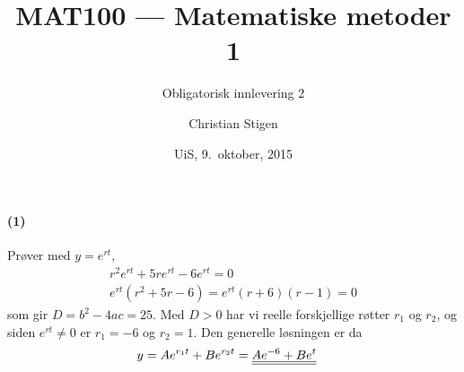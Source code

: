 \documentclass[a4paper,norsk,12pt]{article}
\title{MAT100 --- Matematiske metoder 1}
\subtitle{Obligatorisk innlevering 2}
\author{Christian Stigen}
\date{UiS, 9.~oktober, 2015}
\begin{document}
\maketitle

\paragraph{(1)} Prøver med $y=e^{rt}$,
\begin{equation*}
  \begin{split}
    r^2e^{rt} + 5re^{rt} - 6e^{rt} = 0 \\
    e^{rt}(r^2+5r-6) = e^{rt}(r+6)(r-1) = 0
  \end{split}
\end{equation*}
%
som gir $D = b^2 - 4ac = 25$. Med $D > 0$ har vi reelle forskjellige røtter
$r_1$ og $r_2$, og siden $e^{rt} \neq 0$ er $r_1=-6$ og $r_2=1$. Den generelle
løsningen er da
\begin{equation*}
  \begin{split}
    y & = Ae^{r_1t} + Be^{r_2t} = {\underline{\underline{Ae^{-6} + Be^t}}}
  \end{split}
\end{equation*}
\end{document}
